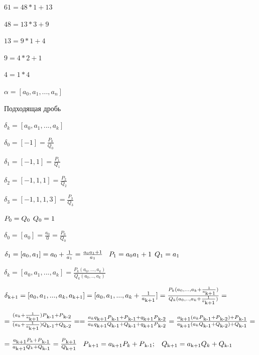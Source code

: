 \documentclass[12pt]{article}
\begin{document}
$61 = 48*1 + 13$

$48 = 13*3 + 9$

$13 = 9*1 + 4$

$9 = 4*2+1$

$4=1*4$

$\alpha = [a_0,a_1,...,a_n]$

            Подходящая дробь

        $\delta_k = [a_0,a_1,...,a_k]$

$\delta_0 = [-1] = \frac{P_0}{Q_0}$

$\delta_1 = [-1,1] = \frac{P_1}{Q_1}$

$\delta_2 = [-1,1,1] = \frac{P_2}{Q_2}$

$\delta_3 = [-1,1,1,3] = \frac{P_3}{Q_3}$

$P_0 = Q_0 \hspace{1 ex } Q_0 = 1$

$\delta_0 = [a_0] = \frac{a_0}{0} = \frac{P_0}{Q_0}$

$\delta_1 = [a_0, a_1] = a_0 + \frac{1}{a_1} = \frac{a_0 a_1 +1}{a_1} \hspace{2 ex} P_1 = a_0 a_1 +1 \hspace{1 ex} Q_1 = a_1$

$\delta_k = [a_0,a_1,...,a_k] = \frac{P_k(a_0,...,a_k)}{Q_k(a_0,..,a_k)}$

$\delta\textsubscript{k+1} = [a_0,a_1,...,a_k,a\textsubscript{k+1}] =[a_0,a_1,...,a_k+\frac{1}{ a\textsubscript{k+1}}] =  \frac{P_k(a_0,...,a_k+\frac{1}{ a\textsubscript{k+1}} )}{Q_k(a_0,..,a_k+\frac{1}{ a\textsubscript{k+1}})} = \vspace{2 ex}$

$= \frac{(a_k + \frac{1}{a\textsubscript{k+1}}) P\textsubscript{k-1} + P\textsubscript{k-2}}{(a_k + \frac{1}{a\textsubscript{k+1}}) Q\textsubscript{k-1} + Q\textsubscript{k-2}} =
        = \frac{a_k q\textsubscript{k+1} P\textsubscript{k-1} + P\textsubscript{k-1} + q\textsubscript{k+1} P\textsubscript{k-2}}{a_k q\textsubscript{k+1} Q\textsubscript{k-1} + Q\textsubscript{k-1} + q\textsubscript{k+1} P\textsubscript{k-2}} = \frac{a\textsubscript{k+1} (a_k P\textsubscript{k-1} + P\textsubscript{k-2}) + P\textsubscript{k-1}}{a\textsubscript{k+1} (a_k Q\textsubscript{k-1} + Q\textsubscript{k-2}) + Q\textsubscript{k-1}} = $

$= \frac{a\textsubscript{k+1} P_k + P\textsubscript{k-1}}{a\textsubscript{k+1} Q_k + Q\textsubscript{k-1}} = \frac{P\textsubscript{k+1}}{Q\textsubscript{k+1}} \hspace{2 ex} P\textsubscript{k+1} = a\textsubscript{k+1} P_k + P\textsubscript{k-1} ; \hspace{2 ex} Q\textsubscript{k+1} = a\textsubscript{k+1} Q_k + Q\textsubscript{k-1} \vspace{2 ex}$
\end{document}
